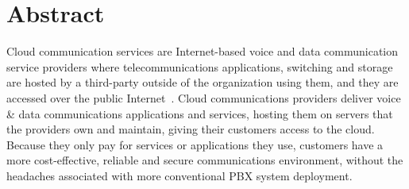 \section{Abstract}
\label{sec-abstract}

Cloud communication services are Internet-based voice and data communication service providers where telecommunications applications, switching and storage are hosted by a third-party outside of the organization using them, and they are accessed over the public Internet~\cite{wikicc}. 
Cloud communications providers deliver voice & data communications applications and services, hosting them on servers that the providers own and maintain, giving their customers access to the cloud. Because they only pay for services or applications they use, customers have a more cost-effective, reliable and secure communications environment, without the headaches associated with more conventional PBX system deployment.



